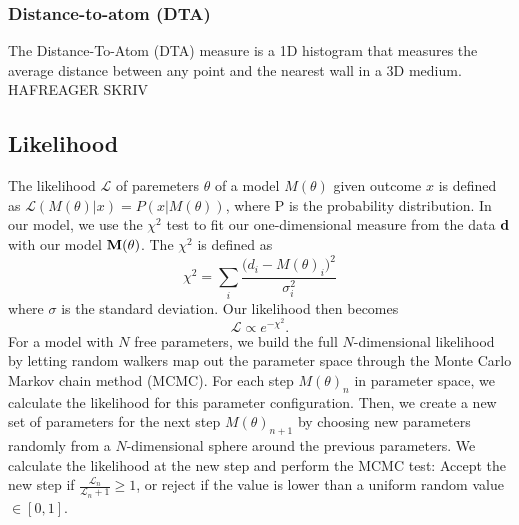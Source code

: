 \documentclass[aps,pre,twocolumn,letterpaper,floatfix,showpacs]{revtex4}
\begin{document}
\subsubsection{Distance-to-atom (DTA)}
 The Distance-To-Atom (DTA) measure is a 1D histogram that measures the average distance between any point and the nearest wall in a 3D medium. HAFREAGER SKRIV





\subsection{Likelihood}
The likelihood $\mathcal{L}$ of paremeters $\theta$ of a model $M(\theta)$ given outcome $x$ is defined as $\mathcal{L} (M(\theta) | x) = P( x | M(\theta))$, where P is the probability distribution. In our model, we use the $\chi^2$ test to fit our one-dimensional measure from the data $\bf d$ with our model $\bf M(\theta)$. The $\chi^2$ is defined as 
\begin{equation}
  \chi^2 = \sum_i \frac{ \Big(d_i - M(\theta)_i \Big)^2}{\sigma_i^2}
\end{equation}    
where $\sigma$ is the standard deviation. Our likelihood then becomes
\begin{equation}
\mathcal L \propto e^{-\chi^2}.
\end{equation}
For a model with $N$ free parameters, we build the full $N$-dimensional likelihood by letting random walkers map out the parameter space through the Monte Carlo Markov chain method (MCMC). For each step $M(\theta)_n$ in parameter space, we calculate the likelihood for this parameter configuration. Then, we create a new set of parameters for the next step $M(\theta)_{n+1}$ by choosing new parameters randomly from a $N$-dimensional sphere around the previous parameters. We calculate the likelihood at the new step and perform the MCMC test: Accept the new step if $\frac{\mathcal L_n}{\mathcal L_n+1} \ge 1$, or reject if the value is lower than a uniform random value $\in [0,1]$.  
\end{document}
